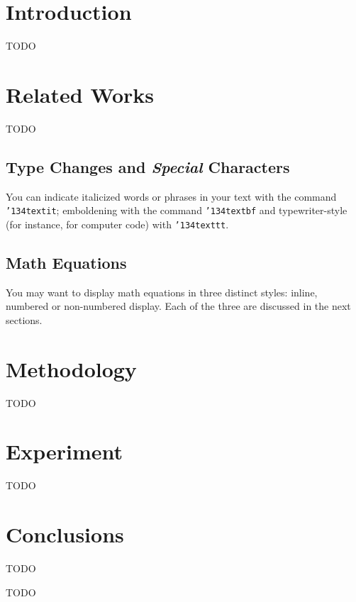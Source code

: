 \documentclass[sigconf]{acmart}
\begin{document}


\maketitle

\section{Introduction}

TODO

\section{Related Works}
TODO
\subsection{Type Changes and {\itshape Special} Characters}
You can indicate italicized words or phrases in your text with the command \texttt{{\char'134}textit}; emboldening with the command \texttt{{\char'134}textbf} and typewriter-style (for instance, for computer code) with \texttt{{\char'134}texttt}.  
\subsection{Math Equations}
You may want to display math equations in three distinct styles:
inline, numbered or non-numbered display.  Each of
the three are discussed in the next sections.

\section{Methodology}
TODO
\section{Experiment}
TODO
\section{Conclusions}
TODO

\begin{acks}
TODO
\end{acks}




 
\end{document}
